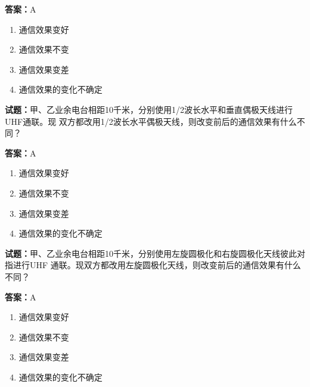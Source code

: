 \documentclass{ctexbook}
\begin{document}
\textbf{答案：}A 

\begin{enumerate}[leftmargin=3em]
  \item 通信效果变好 

  \item 通信效果不变 

  \item 通信效果变差 

  \item 通信效果的变化不确定 

\end{enumerate}





\vspace{1em}

\textbf{试题：}甲、乙业余电台相距10千米，分别使用1/2波长水平和垂直偶极天线进行UHF通联。现
双方都改用1/2波长水平偶极天线，则改变前后的通信效果有什么不同？ 

\textbf{答案：}A 

\begin{enumerate}[leftmargin=3em]
  \item 通信效果变好 

  \item 通信效果不变 

  \item 通信效果变差 

  \item 通信效果的变化不确定 

\end{enumerate}






\vspace{1em}

\textbf{试题：}甲、乙业余电台相距10千米，分别使用左旋圆极化和右旋圆极化天线彼此对指进行UHF
通联。现双方都改用左旋圆极化天线，则改变前后的通信效果有什么不同？ 

\textbf{答案：}A 

\begin{enumerate}[leftmargin=3em]
  \item 通信效果变好 

  \item 通信效果不变 

  \item 通信效果变差 

  \item 通信效果的变化不确定 

\end{enumerate}
\end{document}
